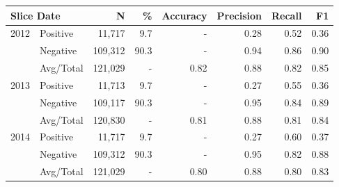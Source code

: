 \begin{tabular}{llrrrrrr} \toprule
\multicolumn{2}{l}{Slice Date} & N       & \%   & Accuracy  & Precision  & Recall  & F1   \\ \midrule
2012 & Positive & 11,717  & 9.7  & -    & 0.28 & 0.52 & 0.36 \\
     & Negative & 109,312 & 90.3 & -    & 0.94 & 0.86 & 0.90 \\
     & Avg/Total & 121,029 & -    & 0.82 & 0.88 & 0.82 & 0.85 \\ \midrule
2013 & Positive & 11,713  & 9.7  & -    & 0.27 & 0.55 & 0.36 \\
     & Negative & 109,117 & 90.3 & -    & 0.95 & 0.84 & 0.89 \\
     & Avg/Total & 120,830 & -    & 0.81 & 0.88 & 0.81 & 0.84 \\ \midrule
2014 & Positive & 11,717  & 9.7  & -    & 0.27 & 0.60 & 0.37 \\
     & Negative & 109,312 & 90.3 & -    & 0.95 & 0.82 & 0.88 \\
     & Avg/Total & 121,029 & -    & 0.80 & 0.88 & 0.80 & 0.83 \\
\bottomrule \end{tabular}

